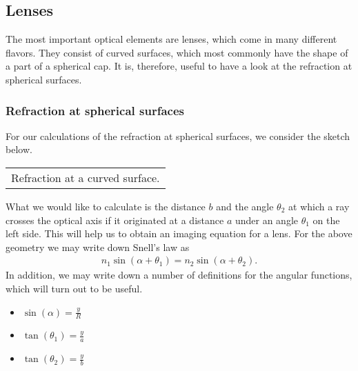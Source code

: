 \documentclass[letterpaper,10pt,english]{sphinxmanual}
\begin{document}
\subsection{Lenses}
\label{\detokenize{notebooks/L3/Optical Elements:Lenses}}
The most important optical elements are lenses, which come in many different flavors. They consist of curved surfaces, which most commonly have the shape of a part of a spherical cap. It is, therefore, useful to have a look at the refraction at spherical surfaces.


\subsubsection{Refraction at spherical surfaces}
\label{\detokenize{notebooks/L3/Optical Elements:Refraction-at-spherical-surfaces}}
For our calculations of the refraction at spherical surfaces, we consider the sketch below.


\begin{savenotes}\sphinxattablestart
\centering
\begin{tabulary}{\linewidth}[t]{|T|}
\hline
\sphinxstyletheadfamily 
{}
\\
\hline
{} Refraction at a curved surface.
\\
\hline
\end{tabulary}
\par
\sphinxattableend\end{savenotes}

What we would like to calculate is the distance \(b\) and the angle \(\theta_2\) at which a ray crosses the optical axis if it originated at a distance \(a\) under an angle \(\theta_1\) on the left side. This will help us to obtain an imaging equation for a lens. For the above geometry we may write down Snell’s law as
\begin{equation*}
\begin{split}n_{1}\sin(\alpha+\theta_1)=n_{2}\sin(\alpha+\theta_2).\end{split}
\end{equation*}
In addition, we may write down a number of definitions for the angular functions, which will turn out to be useful.
\begin{itemize}
\item {} 
\(\sin(\alpha)=\frac{y}{R}\)

\item {} 
\(\tan(\theta_1)=\frac{y}{a}\)

\item {} 
\(\tan(\theta_2)=\frac{y}{b}\)

\end{itemize}
\end{document}
